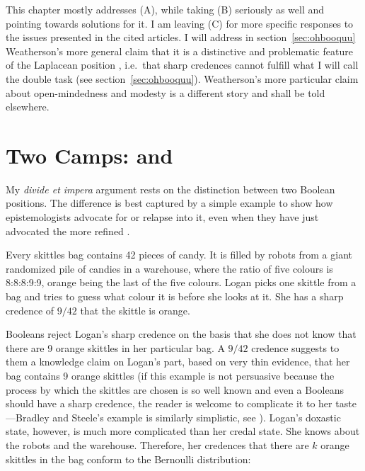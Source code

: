 \documentclass[phd,12pt,oneside]{ubcthesis}
\begin{document}
This chapter mostly addresses (A), while taking (B) seriously as well
and pointing towards solutions for it. I am leaving (C) for more
specific responses to the issues presented in the cited articles. I
will address in section~\ref{sec:ohbooquu} Weatherson's more general
claim that it is a distinctive and problematic feature of the
Laplacean position 
, i.e.\ that sharp credences cannot fulfill
what I will call the double task (see section~\ref{sec:ohbooquu}).
Weatherson's more particular claim about open-mindedness and modesty
is a different story and shall be told elsewhere.

\section{Two Camps: {\anderson} and {\augustin}}
\label{sec:ulolumei}

My \emph{divide et impera} argument rests on the distinction between
two Boolean positions. The difference is best captured by a simple
example to show how epistemologists advocate for {\anderson} or
relapse into it, even when they have just advocated the more refined
{\augustin}.

\begin{quotex}
  \label{ex:skittles} Every skittles bag contains
  42 pieces of candy. It is filled by robots from a giant randomized
  pile of candies in a warehouse, where the ratio of five colours is
  8:8:8:9:9, orange being the last of the five colours. Logan picks
  one skittle from a bag and tries to guess what colour it is before
  she looks at it. She has a sharp credence of $9/42$ that the skittle
  is orange.
\end{quotex}

{\anderson} Booleans reject Logan's sharp credence on the basis that
she does not know that there are 9 orange skittles in her particular
bag. A $9/42$ credence suggests to them a knowledge claim on Logan's
part, based on very thin evidence, that her bag contains 9 orange
skittles (if this example is not persuasive because the process by
which the skittles are chosen is so well known and even a {\anderson}
Booleans should have a sharp credence, the reader is welcome to
complicate it to her taste---Bradley and Steele's example is similarly
simplistic, see ). Logan's doxastic
state, however, is much more complicated than her credal state. She
knows about the robots and the warehouse. Therefore, her credences
that there are $k$ orange skittles in the bag conform to the Bernoulli
distribution:
\end{document}
